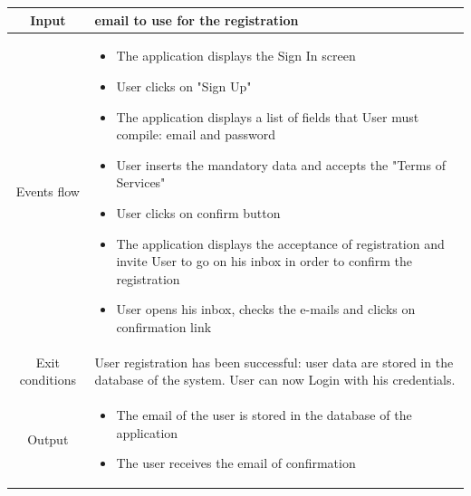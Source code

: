 \documentclass[table, 12pt]{article}
\begin{document}
\begin{longtable}{ | c | p{10cm} | }
    Input            & email to use for the registration                                                                                                                                                                                                                                      \\ \hline
    Events flow      & \begin{itemize}[nosep,after=\strut]
        \item The application displays the Sign In screen
        \item User clicks on "Sign Up"
        \item The application displays a list of fields that User must compile: email and password
        \item User inserts the mandatory data and accepts the "Terms of Services"
        \item User clicks on confirm button
        \item The application displays the acceptance of registration and invite User to go on his inbox in order to confirm the registration
        \item User opens his inbox, checks the e-mails and clicks on confirmation link
    \end{itemize}                                                                                                                                                                                                                                             \\
    \hline
    Exit conditions  & User registration has been successful: user data are stored in the database of the system. User can now Login with his credentials.                                                                                                                                    \\ \hline
    Output           & \begin{itemize}
        \item The email of the user is stored in the database of the application
        \item The user receives the email of confirmation
    \end{itemize}                                                                                                                                                                                                                                             \\
    \hline
    \hline

\end{longtable}
\end{document}
